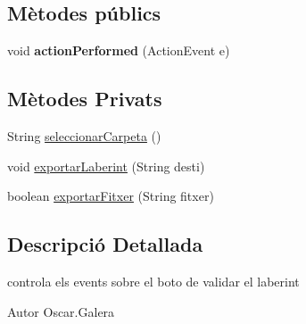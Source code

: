 \subsection*{Mètodes públics}
\begin{DoxyCompactItemize}
\item 
\hypertarget{classinterficie_1_1_f_editor_laberint_1_1_action_validar_laberint_a91bc69391e983aeb130a92de2e9b98ab}{void {\bfseries action\+Performed} (Action\+Event e)}\label{classinterficie_1_1_f_editor_laberint_1_1_action_validar_laberint_a91bc69391e983aeb130a92de2e9b98ab}

\end{DoxyCompactItemize}
\subsection*{Mètodes Privats}
\begin{DoxyCompactItemize}
\item 
String \hyperlink{classinterficie_1_1_f_editor_laberint_1_1_action_validar_laberint_a8202d42d8f9cda5a1543fda054afcdb7}{seleccionar\+Carpeta} ()
\item 
void \hyperlink{classinterficie_1_1_f_editor_laberint_1_1_action_validar_laberint_a99559123f9ab20e8d62b2f979412731e}{exportar\+Laberint} (String desti)
\item 
boolean \hyperlink{classinterficie_1_1_f_editor_laberint_1_1_action_validar_laberint_a3ba49c2e5869d88028a37381a123d045}{exportar\+Fitxer} (String fitxer)
\end{DoxyCompactItemize}


\subsection{Descripció Detallada}
controla els events sobre el boto de validar el laberint 

\begin{DoxyAuthor}{Autor}
Oscar.\+Galera 
\end{DoxyAuthor}


